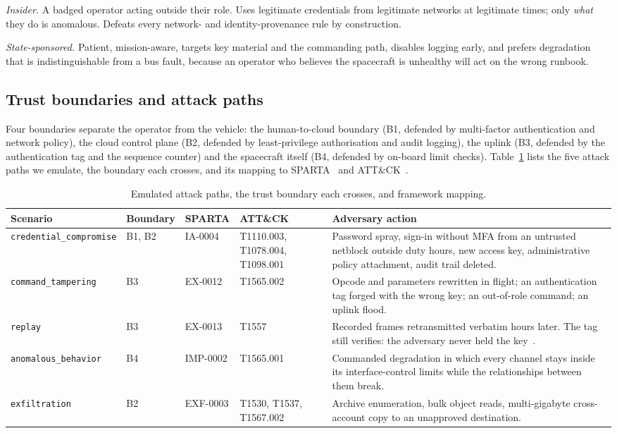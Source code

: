 \documentclass[conference]{IEEEtran}
\begin{document}
\emph{Insider.} A badged operator acting outside their role. Uses legitimate
credentials from legitimate networks at legitimate times; only \emph{what} they
do is anomalous. Defeats every network- and identity-provenance rule by
construction.

\emph{State-sponsored.} Patient, mission-aware, targets key material and the
commanding path, disables logging early, and prefers degradation that is
indistinguishable from a bus fault, because an operator who believes the
spacecraft is unhealthy will act on the wrong runbook.

\subsection{Trust boundaries and attack paths}

Four boundaries separate the operator from the vehicle: the human-to-cloud
boundary (B1, defended by multi-factor authentication and network policy), the
cloud control plane (B2, defended by least-privilege authorisation and audit
logging), the uplink (B3, defended by the authentication tag and the sequence
counter) and the spacecraft itself (B4, defended by on-board limit checks).
Table~\ref{tab:paths} lists the five attack paths we emulate, the boundary each
crosses, and its mapping to SPARTA~\cite{sparta} and ATT\&CK~\cite{attack}.

\begin{table}[t]
\caption{Emulated attack paths, the trust boundary each crosses, and framework mapping.}
\label{tab:paths}
\centering
\footnotesize
\begin{tabular}{@{}llllp{}@{}}
\toprule
\textbf{Scenario} & \textbf{Boundary} & \textbf{SPARTA} & \textbf{ATT\&CK} & \textbf{Adversary action} \\
\midrule
\texttt{credential\_compromise} & B1, B2 & IA-0004 & T1110.003, T1078.004, T1098.001 &
Password spray, sign-in without MFA from an untrusted netblock outside duty
hours, new access key, administrative policy attachment, audit trail deleted. \\
\texttt{command\_tampering} & B3 & EX-0012 & T1565.002 &
Opcode and parameters rewritten in flight; an authentication tag forged with the
wrong key; an out-of-role command; an uplink flood. \\
\texttt{replay} & B3 & EX-0013 & T1557 &
Recorded frames retransmitted verbatim hours later. The tag still verifies: the
adversary never held the key~\cite{syverson1994replay}. \\
\texttt{anomalous\_behavior} & B4 & IMP-0002 & T1565.001 &
Commanded degradation in which every channel stays inside its interface-control
limits while the relationships between them break. \\
\texttt{exfiltration} & B2 & EXF-0003 & T1530, T1537, T1567.002 &
Archive enumeration, bulk object reads, multi-gigabyte cross-account copy to an
unapproved destination. \\
\bottomrule
\end{tabular}
\end{table}
\end{document}
